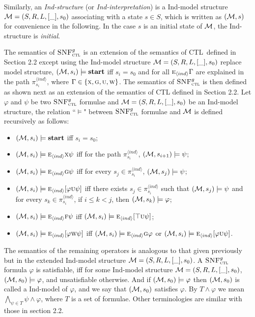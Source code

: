\documentclass[runningheads]{llncs}
\newcommand{\tuple}[1]{{\langle{#1}\rangle}}
\newcommand{\Hm} {{\cal M}}
\newcommand{\start}{\textbf{start}}
\newcommand{\CTL}{\textrm{CTL}}
\newcommand{\Ind}{\textrm{Ind}}
\newcommand{\EXIST}{\textsc{e}}
\newcommand{\NEXT}{\textsc{x}}
\newcommand{\FUTURE}{\textsc{f}}
\newcommand{\UNTIL}{\textsc{u}}
\newcommand{\GLOBAL}{\textsc{g}}
\newcommand{\UNLESS}{\textsc{w}}
\newcommand{\CTLsnf}{{\textsc{SNF}_{\textsc{ctl}}^g}}
\begin{document}
Similarly, an {\em \Ind-structure} (or {\em \Ind-interpretation}) is a \Ind-model structure
${\cal M}=(S, R, L, [\_], s_0)$ associating
with a state $s\in S$, which is written as $({\cal M},s)$ for convenience in the following.
In the case $s$ is an initial state of $\cal M$, the \Ind-structure is {\em initial}.

The semantics of $\CTLsnf$ is an extension of the semantics of \CTL\ defined in Section 2.2 except using the \Ind-model structure $\Hm=(S,R,L,[\_],s_0)$ replace model structure, $({\cal M},s_i) \models \start$ iff $s_i=s_0$ and for all $\EXIST_{\tuple{ind}} \Gamma$ are explained in the path $\pi_{s_i}^{\tuple{ind}}$, where $\Gamma\in \{\NEXT, \GLOBAL, \UNTIL,\UNLESS\}$.
The semantics of $\CTLsnf$ is then
defined as shown next as an extension of the semantics of CTL defined in Section 2.2. Let $\varphi$ and $\psi$ be two $\CTLsnf$ formulae and $\Hm=(S,R,L,[\_],s_0)$ be an \Ind-model structure, the relation ``$\models$" between $\CTLsnf$ formulae and $\Hm$ is defined recursively as follows:
\begin{itemize}
  \item $({\cal M},s_i) \models \start$ iff $s_i=s_0$;
  \item $({\cal M},s_i)\models \EXIST_{\tuple{ind}} \NEXT \psi$ iff for the path $\pi_{s_i}^{\tuple{ind}}$, $(\Hm, s_{i+1})\models \psi$;
  \item $({\cal M},s_i)\models \EXIST_{\tuple{ind}}\GLOBAL\psi$ iff
    for every $s_j \in \pi_{s_i}^{\tuple{ind}}$,
    $(\Hm,s_j) \models \psi$;
  \item $({\cal M},s_i)\models \EXIST_{\tuple{ind}}[\varphi\UNTIL\psi]$ iff
      there exists $s_j\in \pi_{s_i}^{\tuple{ind}}$ such that $(\Hm,s_j) \models \psi$ and for every $s_k \in \pi_{s_i}^{\tuple{ind}}$, if $i\leq k < j$, then $(\Hm,s_k) \models \varphi$;
  \item $(\Hm,s_i) \models \EXIST_{\tuple{ind}} \FUTURE \psi$ iff $(\Hm,s_i) \models \EXIST_{\tuple{ind}}[\top \UNTIL\psi]$;
  \item $({\cal M},s_i)\models \EXIST_{\tuple{ind}}[\varphi\UNLESS\psi]$ iff $(\Hm,s_i) \models \EXIST_{\tuple{ind}}\GLOBAL \varphi$ or $({\cal M},s_i)\models \EXIST_{\tuple{ind}}[\varphi\UNTIL\psi]$.
\end{itemize}
The semantics of the remaining operators is analogous to that given previously but in the
extended \Ind-model structure ${\cal M}=(S, R, L, [\_],s_0)$.
A $\CTLsnf$ formula $\varphi$ is satisfiable, iff for some \Ind-model structure $\Hm=(S,R,L,[\_],s_0)$, $(\Hm,s_0)\models \varphi$, and unsatisfiable otherwise. And if $(\Hm,s_0)\models \varphi$ then $(\Hm,s_0)$ is called a \Ind-model of $\varphi$, and we say that $(\Hm,s_0)$ satisfies $\varphi$.
By $T \wedge \varphi$ we mean $\bigwedge_{\psi\in T} \psi \wedge \varphi$, where $T$ is a set of formulae.
Other terminologies are similar with those in section 2.2.
\end{document}
